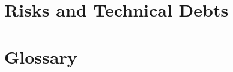 







\section{Risks and Technical Debts}\label{section-technical-risks}

\section{Glossary}\label{section-glossary}

